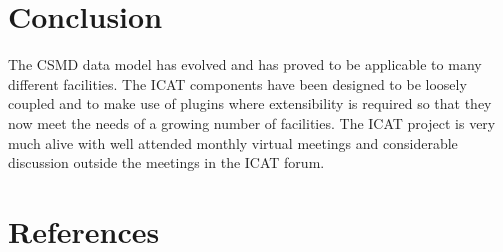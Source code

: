 \documentclass[a4paper]{jpconf}
\begin{document}
\section{Conclusion}
The CSMD data model has evolved and has proved to be applicable to
many different facilities. The ICAT components have been designed to
be loosely coupled and to make use of plugins where extensibility is
required so that they now meet the needs of a growing number of
facilities. The ICAT project is very much alive with well attended
monthly virtual meetings and considerable discussion outside the
meetings in the ICAT forum.

\section*{References}


\end{document}
